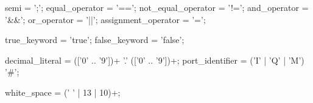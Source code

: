 semi = ';';
equal_operator = '==';
not_equal_operator = '!=';
and_operator = '&&';
or_operator = '||';
assignment_operator = '=';

true_keyword = 'true';
false_keyword = 'false';

decimal_literal = (['0' .. '9'])+ '.' (['0' .. '9'])+;
port_identifier = ('I' | 'Q' | 'M') '#';

white_space = (' ' | 13 | 10)+;
